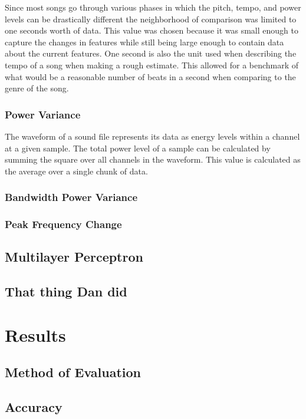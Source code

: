 \documentclass[12pt]{article}
\begin{document}
Since most songs go through various phases in which the pitch, tempo, and power levels can be drastically different the neighborhood of comparison was limited to one seconds worth of data. This value was chosen because it was small enough to capture the changes in features while still being large enough to contain data about the current features. One second is also the unit used when describing the tempo of a song when making a rough estimate. This allowed for a benchmark of what would be a reasonable number of beats in a second when comparing to the genre of the song.

\subsubsection{Power Variance}
The waveform of a sound file represents its data as energy levels within a channel at a given sample. The total power level of a sample can be calculated by summing the square over all channels in the waveform. This value is calculated as the average over a single chunk of data.

\subsubsection{Bandwidth Power Variance}

\subsubsection{Peak Frequency Change}


\subsection{Multilayer Perceptron}


\subsection{That thing Dan did}

\section{Results}

\subsection{Method of Evaluation}

\subsection{Accuracy}
\end{document}
